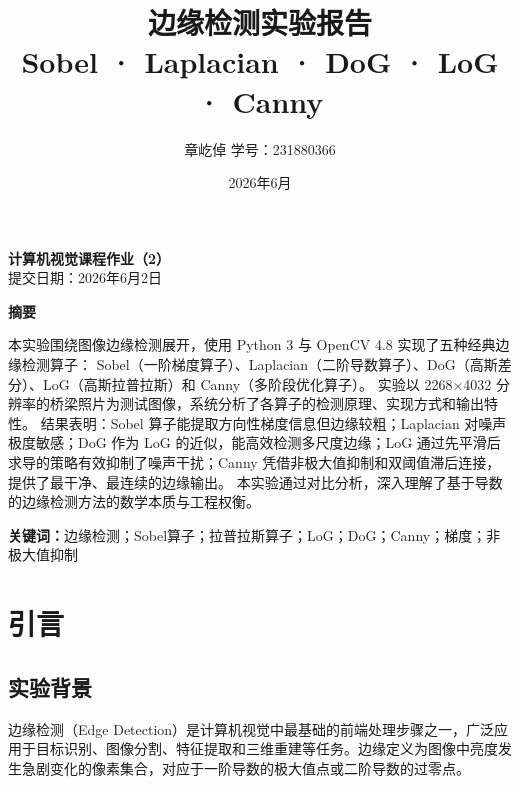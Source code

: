 \documentclass[12pt,a4paper]{ctexart}
\title{\vspace{2cm}\Huge\textbf{边缘检测实验报告}\\[0.5cm]
       \Large Sobel · Laplacian · DoG · LoG · Canny}
\author{\large 章屹倬 \quad 学号：231880366}
\date{\large 2026年6月}
\begin{document}
\maketitle
\thispagestyle{empty}

\vspace{2cm}
\begin{center}
    \large\textbf{计算机视觉课程作业（2）}\\[0.5cm]
    \normalsize 提交日期：2026年6月2日
\end{center}

\newpage

\thispagestyle{empty}
\begin{center}
    \Large\textbf{摘\quad 要}
\end{center}
\vspace{1cm}

本实验围绕图像边缘检测展开，使用 Python 3 与 OpenCV 4.8 实现了五种经典边缘检测算子：
Sobel（一阶梯度算子）、Laplacian（二阶导数算子）、DoG（高斯差分）、LoG（高斯拉普拉斯）和 Canny（多阶段优化算子）。
实验以 2268$\times$4032 分辨率的桥梁照片为测试图像，系统分析了各算子的检测原理、实现方式和输出特性。
结果表明：Sobel 算子能提取方向性梯度信息但边缘较粗；Laplacian 对噪声极度敏感；DoG 作为 LoG 的近似，能高效检测多尺度边缘；LoG 通过先平滑后求导的策略有效抑制了噪声干扰；Canny 凭借非极大值抑制和双阈值滞后连接，提供了最干净、最连续的边缘输出。
本实验通过对比分析，深入理解了基于导数的边缘检测方法的数学本质与工程权衡。

\vspace{1cm}
\noindent\textbf{关键词：}边缘检测；Sobel算子；拉普拉斯算子；LoG；DoG；Canny；梯度；非极大值抑制

\newpage

\tableofcontents
\newpage

\section{引言}

\subsection{实验背景}

边缘检测（Edge Detection）是计算机视觉中最基础的前端处理步骤之一，广泛应用于目标识别、图像分割、特征提取和三维重建等任务。边缘定义为图像中亮度发生急剧变化的像素集合，对应于一阶导数的极大值点或二阶导数的过零点。
\end{document}
